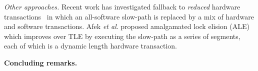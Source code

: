 \vspace{1mm}\noindent\textit{Other approaches.}
Recent work has investigated fallback to \emph{reduced} hardware transactions~\cite{MS13}
in which an all-software slow-path is replaced by a mix of hardware and software transactions. 
Afek \emph{et al}. proposed amalgamated lock elision (ALE)~\cite{ale15} which improves over TLE
by executing the slow-path as a series of segments, each of which is a dynamic length hardware transaction.

\vspace{1mm}\noindent\textbf{Concluding remarks.}